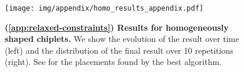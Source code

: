 \begin{figure}[h]
\centering
\captionsetup{justification=centering}
\texttt{[image: img/appendix/homo\_results\_appendix.pdf]}
\caption{\textbf{(\textsection \ref{app:relaxed-constraints}) Results for homogeneously shaped chiplets.}
We show the evolution of the result over time (left) and the distribution of the final result over 10 repetitions (right).
See  for the placements found by the best algorithm.}
\label{fig:app-homo-results}
\end{figure}
